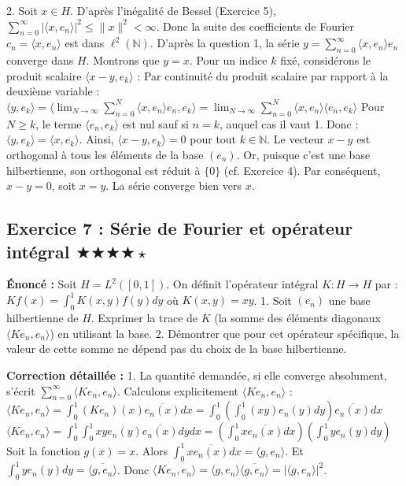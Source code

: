 \documentclass[11pt,a4paper]{article}
\begin{document}
2. Soit $x \in H$. D'après l'inégalité de Bessel (Exercice 5), $\sum_{n=0}^\infty |\langle x, e_n \rangle|^2 \leq \|x\|^2 < \infty$.
   Donc la suite des coefficients de Fourier $c_n = \langle x, e_n \rangle$ est dans $\ell^2(\mathbb{N})$.
   D'après la question 1, la série $y = \sum_{n=0}^\infty \langle x, e_n \rangle e_n$ converge dans $H$.
   Montrons que $y = x$.
   Pour un indice $k$ fixé, considérons le produit scalaire $\langle x - y, e_k \rangle$ :
   Par continuité du produit scalaire par rapport à la deuxième variable :
   $\langle y, e_k \rangle = \langle \lim_{N \to \infty} \sum_{n=0}^N \langle x, e_n \rangle e_n, e_k \rangle = \lim_{N \to \infty} \sum_{n=0}^N \langle x, e_n \rangle \langle e_n, e_k \rangle$
   Pour $N \geq k$, le terme $\langle e_n, e_k \rangle$ est nul sauf si $n=k$, auquel cas il vaut 1. Donc :
   $\langle y, e_k \rangle = \langle x, e_k \rangle$.
   Ainsi, $\langle x - y, e_k \rangle = 0$ pour tout $k \in \mathbb{N}$.
   Le vecteur $x - y$ est orthogonal à tous les éléments de la base $(e_n)$. Or, puisque c'est une base hilbertienne, son orthogonal est réduit à $\{0\}$ (cf. Exercice 4).
   Par conséquent, $x - y = 0$, soit $x = y$. La série converge bien vers $x$.


\subsection*{Exercice 7 : Série de Fourier et opérateur intégral $\bigstar\bigstar\bigstar\bigstar\star$}

\textbf{Énoncé :}
Soit $H = L^2([0, 1])$. On définit l'opérateur intégral $K: H \to H$ par :
$Kf(x) = \int_0^1 K(x,y) f(y) dy$ où $K(x,y) = xy$.
1. Soit $(e_n)$ une base hilbertienne de $H$. Exprimer la trace de $K$ (la somme des éléments diagonaux $\langle K e_n, e_n \rangle$) en utilisant la base.
2. Démontrer que pour cet opérateur spécifique, la valeur de cette somme ne dépend pas du choix de la base hilbertienne.

\textbf{Correction détaillée :}
1. La quantité demandée, si elle converge absolument, s'écrit $\sum_{n=0}^\infty \langle K e_n, e_n \rangle$.
   Calculons explicitement $\langle K e_n, e_n \rangle$ :
   $\langle K e_n, e_n \rangle = \int_0^1 (K e_n)(x) \overline{e_n(x)} dx = \int_0^1 \left( \int_0^1 (xy) e_n(y) dy \right) \overline{e_n(x)} dx$
   $\langle K e_n, e_n \rangle = \int_0^1 \int_0^1 x y e_n(y) \overline{e_n(x)} dy dx = \left( \int_0^1 x \overline{e_n(x)} dx \right) \left( \int_0^1 y e_n(y) dy \right)$
   Soit la fonction $g(x) = x$. Alors $\int_0^1 x \overline{e_n(x)} dx = \langle g, e_n \rangle$.
   Et $\int_0^1 y e_n(y) dy = \overline{\langle g, e_n \rangle}$.
   Donc $\langle K e_n, e_n \rangle = \langle g, e_n \rangle \overline{\langle g, e_n \rangle} = |\langle g, e_n \rangle|^2$.
\end{document}
